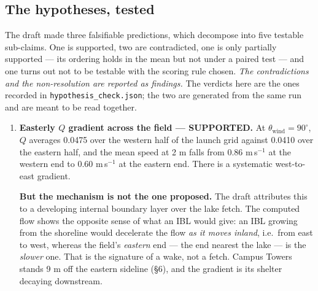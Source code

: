\documentclass[11pt,letterpaper]{article}
\begin{document}
\subsection{The hypotheses, tested}

The draft made three falsifiable predictions, which decompose into five testable
sub-claims. One is supported, two are contradicted, one is only partially
supported --- its ordering holds in the mean but not under a paired test --- and
one turns out not to be testable with the scoring rule chosen. \emph{The
contradictions and the non-resolution are reported as findings.} The verdicts
here are the ones recorded in \texttt{hypothesis\_check.json}; the two are
generated from the same run and are meant to be read together.

\begin{enumerate}[leftmargin=*,itemsep=4pt]
  \item \textbf{Easterly $Q$ gradient across the field --- SUPPORTED.} At
    $\theta_{\text{wind}} = 90^\circ$, $Q$ averages 0.0475 over the western half
    of the launch grid against 0.0410 over the eastern half, and the mean speed
    at 2 m falls from 0.86 m\,s$^{-1}$ at the western end to 0.60 m\,s$^{-1}$ at
    the eastern end. There is a systematic west-to-east gradient.

    \textbf{But the mechanism is not the one proposed.} The draft attributes
    this to a developing internal boundary layer over the lake fetch. The
    computed flow shows the opposite sense of what an IBL would give: an IBL
    growing from the shoreline would decelerate the flow \emph{as it moves
    inland}, i.e.\ from east to west, whereas the field's \emph{eastern} end ---
    the end nearest the lake --- is the \emph{slower} one. That is the signature
    of a wake, not a fetch. Campus Towers stands 9 m off the eastern sideline
    (\S6), and the gradient is its shelter decaying downstream.


\end{enumerate}
\end{document}
